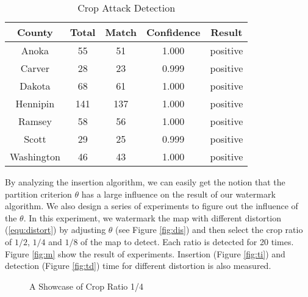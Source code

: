 \begin{table}[ht]
\centering
\caption{Crop Attack Detection}
\label{tab:crop}
\begin{tabular}{|c||c|c|c|c|} 
\hline
County & Total & Match & Confidence & Result \\\hline \hline
Anoka & 55 & 51 & 1.000 & positive\\\hline
Carver & 28 & 23 & 0.999 & positive\\\hline
Dakota & 68 & 61 & 1.000 & positive\\\hline
Hennipin & 141 & 137 & 1.000 & positive\\\hline
Ramsey & 58 & 56 & 1.000 & positive\\\hline
Scott & 29 & 25 & 0.999 & positive\\\hline
Washington & 46 & 43 & 1.000 & positive\\\hline
\end{tabular}
\end{table}

By analyzing the insertion algorithm, we can easily get the notion that the 
partition criterion $\theta $ has a large influence on the result of our watermark 
algorithm. We also design a series of experiments to figure out the influence 
of the $\theta $. In this experiment, we watermark the map with different distortion 
(\ref{equ:distort}) by adjusting $\theta $ (see Figure \ref{fig:dis}) and then select 
the crop ratio of $1/2$, $1/4$ and $1/8$ of the map to detect. Each ratio is detected 
for 20 times.  Figure \ref{fig:m} show the result of experiments. 
Insertion (Figure \ref{fig:ti}) and detection (Figure \ref{fig:td}) time 
for different distortion is also measured.

\begin{figure}[th]
\centering
{}
\caption{A Showcase of Crop Ratio 1/4}
\label{fig:cropmethod}
\end{figure}



